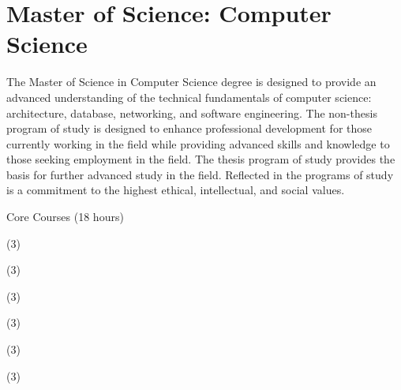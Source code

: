 \label{program:ms-cs}%
\section*{Master of Science: Computer Science}

The Master of Science in Computer Science degree is designed to provide an advanced understanding of the technical fundamentals of computer science: architecture, database, networking, and software engineering. The non-thesis program of study is designed to enhance professional development for those currently working in the field while providing advanced skills and knowledge to those seeking employment in the field. The thesis program of study provides the basis for further advanced study in the field. Reflected in the programs of study is a commitment to the highest ethical, intellectual, and social values.

\begin{reqgroup}{Core Courses (18 hours)}
\begin{checklist}
\begin{minipage}[t]{0.5\linewidth}
	\item (3) 
	\item (3) 
	\item (3) 
\end{minipage}
\begin{minipage}[t]{0.5\linewidth}
	\item (3) 
	\item (3) 
	\item (3) 
\end{minipage}
\end{checklist}
\end{reqgroup}


